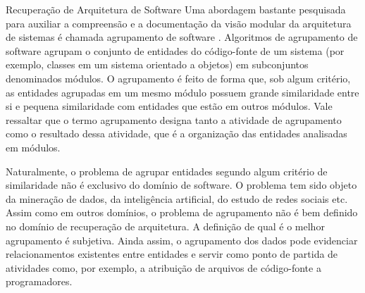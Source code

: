 \begin{section}{Recuperação de Arquitetura de Software}
Uma abordagem bastante pesquisada para auxiliar a compreensão e a documentação da visão modular da arquitetura de sistemas é chamada agrupamento de software \cite{Mancoridis1998,Andritsos2005,Maqbool2007}. Algoritmos de agrupamento de software agrupam o conjunto de entidades do código-fonte de um sistema (por exemplo, classes em um sistema orientado a objetos) em subconjuntos denominados módulos. O agrupamento é feito de forma que, sob algum critério, as entidades agrupadas em um mesmo módulo possuem grande similaridade entre si e pequena similaridade com entidades que estão em outros módulos. Vale ressaltar que o termo agrupamento designa tanto a atividade de agrupamento como o resultado dessa atividade, que é a organização das entidades analisadas em módulos.

Naturalmente, o problema de agrupar entidades segundo algum critério de similaridade não é exclusivo do domínio de software. O problema tem sido objeto da mineração de dados, da inteligência artificial, do estudo de redes sociais etc. Assim como em outros domínios, o problema de agrupamento não é bem definido no domínio de recuperação de arquitetura. A definição de qual é o melhor agrupamento é subjetiva. Ainda assim, o agrupamento dos dados pode evidenciar relacionamentos existentes entre entidades e servir como ponto de partida de atividades como, por exemplo, a atribuição de arquivos de código-fonte a programadores.


\end{section}

